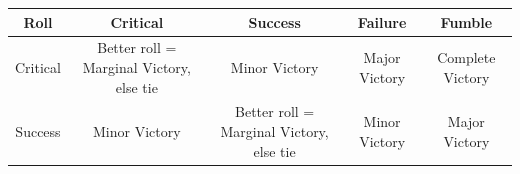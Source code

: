 \documentclass[
]{article}
\begin{document}
\begin{longtable}[]{@{}ccccc@{}}
\toprule
\begin{minipage}[b]{0.10\columnwidth}\centering
Roll\strut
\end{minipage} & \begin{minipage}[b]{0.18\columnwidth}\centering
Critical\strut
\end{minipage} & \begin{minipage}[b]{0.19\columnwidth}\centering
Success\strut
\end{minipage} & \begin{minipage}[b]{0.19\columnwidth}\centering
Failure\strut
\end{minipage} & \begin{minipage}[b]{0.19\columnwidth}\centering
Fumble\strut
\end{minipage}\tabularnewline
\midrule
\endhead
\begin{minipage}[t]{0.10\columnwidth}\centering
Critical\strut
\end{minipage} & \begin{minipage}[t]{0.18\columnwidth}\centering
Better roll = Marginal Victory, else tie\strut
\end{minipage} & \begin{minipage}[t]{0.19\columnwidth}\centering
Minor Victory\strut
\end{minipage} & \begin{minipage}[t]{0.19\columnwidth}\centering
Major Victory\strut
\end{minipage} & \begin{minipage}[t]{0.19\columnwidth}\centering
Complete Victory\strut
\end{minipage}\tabularnewline
\begin{minipage}[t]{0.10\columnwidth}\centering
Success\strut
\end{minipage} & \begin{minipage}[t]{0.18\columnwidth}\centering
Minor Victory\strut
\end{minipage} & \begin{minipage}[t]{0.19\columnwidth}\centering
Better roll = Marginal Victory, else tie\strut
\end{minipage} & \begin{minipage}[t]{0.19\columnwidth}\centering
Minor Victory\strut
\end{minipage} & \begin{minipage}[t]{0.19\columnwidth}\centering
Major Victory\strut
\end{minipage}\tabularnewline

\end{longtable}
\end{document}
